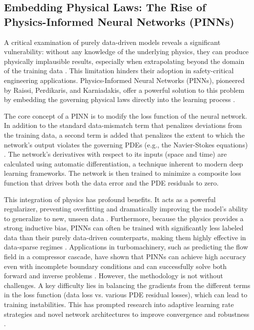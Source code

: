 \documentclass[dsc, EN]{ufabcFHZh}
\begin{document}
\subsection{Embedding Physical Laws: The Rise of Physics-Informed Neural Networks (PINNs)}

A critical examination of purely data-driven models reveals a significant vulnerability: without any knowledge of the underlying physics, they can produce physically implausible results, especially when extrapolating beyond the domain of the training data \citep{synthesized2024}. This limitation hinders their adoption in safety-critical engineering applications. Physics-Informed Neural Networks (PINNs), pioneered by Raissi, Perdikaris, and Karniadakis, offer a powerful solution to this problem by embedding the governing physical laws directly into the learning process \citep{mifsud2016reduced, raissi2019physics}.

The core concept of a PINN is to modify the loss function of the neural network. In addition to the standard data-mismatch term that penalizes deviations from the training data, a second term is added that penalizes the extent to which the network's output violates the governing PDEs (e.g., the Navier-Stokes equations) \citep{synthesized2024}. The network's derivatives with respect to its inputs (space and time) are calculated using automatic differentiation, a technique inherent to modern deep learning frameworks. The network is then trained to minimize a composite loss function that drives both the data error and the PDE residuals to zero.

This integration of physics has profound benefits. It acts as a powerful regularizer, preventing overfitting and dramatically improving the model's ability to generalize to new, unseen data \citep{PINNs_for_Industrial_Gas_Turbines, PINNs_for_Industrial_Gas_Turbines_2}. Furthermore, because the physics provides a strong inductive bias, PINNs can often be trained with significantly less labeled data than their purely data-driven counterparts, making them highly effective in data-sparse regimes \citep{synthesized2024}. Applications in turbomachinery, such as predicting the flow field in a compressor cascade, have shown that PINNs can achieve high accuracy even with incomplete boundary conditions and can successfully solve both forward and inverse problems \citep{synthesized2024}. However, the methodology is not without challenges. A key difficulty lies in balancing the gradients from the different terms in the loss function (data loss vs. various PDE residual losses), which can lead to training instabilities. This has prompted research into adaptive learning rate strategies and novel network architectures to improve convergence and robustness \citep{synthesized2024}.
\end{document}
